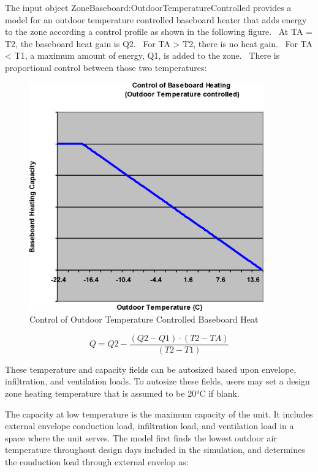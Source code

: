 The input object ZoneBaseboard:OutdoorTemperatureControlled provides a model for an outdoor temperature controlled baseboard heater that adds energy to the zone according a control profile as shown in the following figure.~ At TA = T2, the baseboard heat gain is Q2.~ For TA \textgreater{} T2, there is no heat gain.~ For TA \textless{} T1, a maximum amount of energy, Q1, is added to the zone.~ There is proportional control between those two temperatures:

\begin{figure}[hbtp] %
\centering
\includegraphics[width=0.9\textwidth, height=0.9\textheight, keepaspectratio=true]{media/image5821.png}
\caption{Control of Outdoor Temperature Controlled Baseboard Heat \protect \label{fig:control-of-outdoor-temperature-controlled}}
\end{figure}

\begin{equation}
Q = Q2 - \frac{{(Q2 - Q1)\cdot (T2 - TA)}}{{(T2 - T1)}}
\end{equation}

These temperature and capacity fields can be autosized based upon envelope, infiltration, and ventilation loads. To autosize these fields, users may set a design zone heating temperature that is assumed to be 20°C if blank.

The capacity at low temperature is the maximum capacity of the unit. It includes external envelope conduction load, infiltration load, and ventilation load in a space where the unit serves. The model first finds the lowest outdoor air temperature throughout design days included in the simulation, and determines the conduction load through external envelop as:

